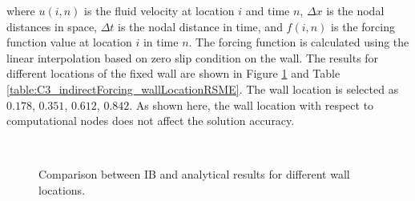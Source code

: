 where $u(i, n)$ is the fluid velocity at location $i$ and time $n$, $\Delta x$ is the nodal distances in space, $\Delta t$ is the nodal distance in time, and $f(i,n)$ is the forcing function value at location $i$ in time $n$. The forcing function is calculated using the linear interpolation based on zero slip condition on the wall. The results for different locations of the fixed wall are shown in Figure \ref{fig:C3_indirectForcing_wallLocation} and Table \ref{table:C3_indirectForcing_wallLocationRSME}. The wall location is selected as $0.178$, $0.351$, $0.612$, $0.842$. As shown here, the wall location with respect to computational nodes does not affect the solution accuracy.

\begin{figure}[H]
    \centering
    \quad
    \\
    \quad
    \caption{Comparison between IB and analytical results for different wall locations.}
    \label{fig:C3_indirectForcing_wallLocation}
\end{figure}

